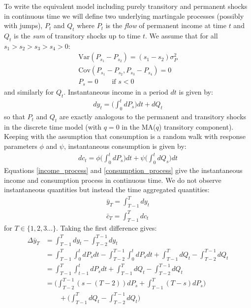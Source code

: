 \documentclass[titlepage]{\econtex}\newcommand{\texname}{IncomeUncertainty}
\begin{document}
To write the equivalent model including purely transitory and permanent shocks in continuous time we will define two underlying martingale processes (possibly with jumps), $P_t$ and $Q_t$ where $P_t$ is the \textit{flow} of permanent income at time $t$ and $Q_t$ is the \textit{sum} of transitory shocks up to time $t$. We assume that for all  $s_1>s_2>s_3>s_4>0$:
\begin{align*}
\mathrm{Var}(P_{s_1}-P_{s_2})=(s_1-s_2)\sigma_P^2 \\
\mathrm{Cov}(P_{s_1}-P_{s_2},P_{s_3}-P_{s_4}) = 0 \\
P_s = 0 \qquad \text{if } s<0
\end{align*}
and similarly for $Q_t$. Instantaneous income in a period $dt$ is given by:
\begin{align}
dy_t = \Big( \int_{0}^{t}dP_s \Big) dt  +dQ_t \label{income_process}
\end{align}
so that $P_t$ and $Q_t$ are exactly analogous to the permanent and transitory shocks in the discrete time model (with $q=0$ in the MA($q$) transitory component). Keeping with the assumption that consumption is a random walk with response parameters $\phi$ and $\psi$, instantaneous consumption is given by:
\begin{align}
dc_t = \phi \Big( \int_{0}^{t} dP_s  \Big) dt +\psi\Big( \int_{0}^{t}dQ_s\Big) dt  \label{consumption_process}
\end{align}
Equations \ref{income_process} and \ref{consumption_process} give the instantaneous income and consumption process in continuous time. We do not observe instantaneous quantities but instead the time aggregated quantities:
\begin{align}
\bar{y}_T = \int_{T-1}^{T} dy_t \label{income_TA}\\
\bar{c}_T = \int_{T-1}^{T} dc_t \label{cons_TA}
\end{align}
for $T \in \{1,2,3...\}$. Taking the first difference gives:
\begin{align}
\Delta \bar{y}_T &= \int_{T-1}^{T} dy_t  - \int_{T-2}^{T-1} dy_t  \nonumber \\ 
&= \int_{T-1}^{T} \int_{0}^{t}dP_s dt -\int_{T-2}^{T-1} \int_{0}^{t}dP_s dt +  \int_{T-1}^{T} dQ_t -\int_{T-2}^{T-1} dQ_t \nonumber \\
&= \int_{T-1}^{T} \int_{t-1}^{t}dP_s dt +  \int_{T-1}^{T} dQ_t -\int_{T-2}^{T-1} dQ_t \nonumber \\
&= \Big(\int_{T-2}^{T-1} (s-(T-2))dP_s  + \int_{T-1}^{T} (T-s)dP_s \Big) \nonumber \\
& \qquad + \Big(\int_{T-1}^{T} dQ_t -\int_{T-2}^{T-1} dQ_t \Big) \label{deltay}
\end{align}
\end{document}
